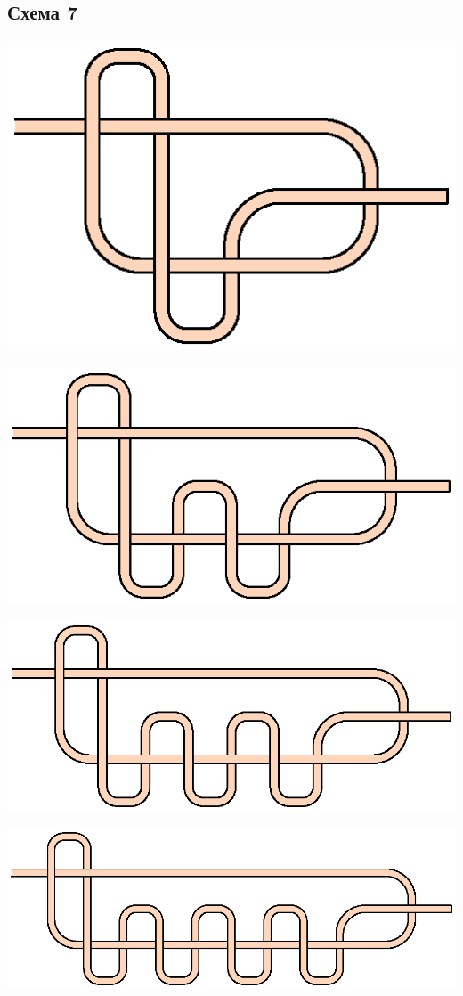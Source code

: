 \subsection{Схема 7}
\graphicspath{{\currentpath}}

\includegraphics{images/s-07-a1.eps}

\includegraphics{images/s-07-a2.eps}

\includegraphics{images/s-07-a3.eps}

\includegraphics{images/s-07-a4.eps}